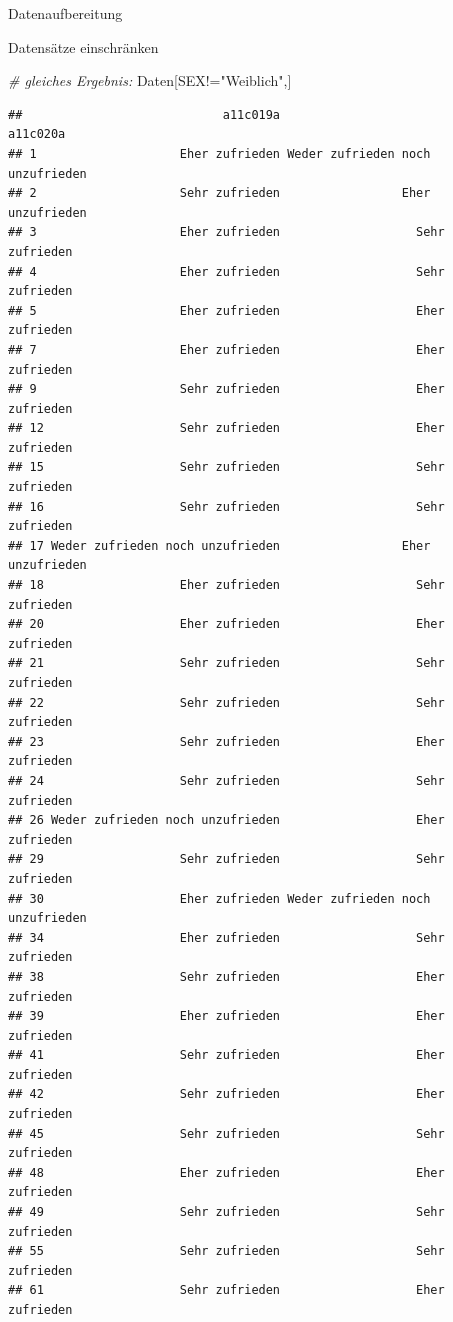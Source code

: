 \documentclass[ignorenonframetext,]{beamer}
\newenvironment{Shaded}{}{}
\newcommand{\StringTok}[1]{\textcolor[rgb]{0.25,0.44,0.63}{{#1}}}
\newcommand{\CommentTok}[1]{\textcolor[rgb]{0.38,0.63,0.69}{\textit{{#1}}}}
\newcommand{\NormalTok}[1]{{#1}}
\begin{document}
\begin{frame}[fragile]{Datenaufbereitung}
\begin{block}{Datensätze einschränken}
\begin{Shaded}
\begin{Highlighting}[]
\CommentTok{# gleiches Ergebnis:}
\NormalTok{Daten[SEX!=}\StringTok{"Weiblich"}\NormalTok{,]}
\end{Highlighting}
\end{Shaded}

\begin{verbatim}
##                            a11c019a                         a11c020a
## 1                    Eher zufrieden Weder zufrieden noch unzufrieden
## 2                    Sehr zufrieden                 Eher unzufrieden
## 3                    Eher zufrieden                   Sehr zufrieden
## 4                    Eher zufrieden                   Sehr zufrieden
## 5                    Eher zufrieden                   Eher zufrieden
## 7                    Eher zufrieden                   Eher zufrieden
## 9                    Sehr zufrieden                   Eher zufrieden
## 12                   Sehr zufrieden                   Eher zufrieden
## 15                   Sehr zufrieden                   Sehr zufrieden
## 16                   Sehr zufrieden                   Sehr zufrieden
## 17 Weder zufrieden noch unzufrieden                 Eher unzufrieden
## 18                   Eher zufrieden                   Sehr zufrieden
## 20                   Eher zufrieden                   Eher zufrieden
## 21                   Sehr zufrieden                   Sehr zufrieden
## 22                   Sehr zufrieden                   Sehr zufrieden
## 23                   Sehr zufrieden                   Eher zufrieden
## 24                   Sehr zufrieden                   Sehr zufrieden
## 26 Weder zufrieden noch unzufrieden                   Eher zufrieden
## 29                   Sehr zufrieden                   Sehr zufrieden
## 30                   Eher zufrieden Weder zufrieden noch unzufrieden
## 34                   Eher zufrieden                   Sehr zufrieden
## 38                   Sehr zufrieden                   Eher zufrieden
## 39                   Eher zufrieden                   Eher zufrieden
## 41                   Sehr zufrieden                   Eher zufrieden
## 42                   Sehr zufrieden                   Eher zufrieden
## 45                   Sehr zufrieden                   Sehr zufrieden
## 48                   Eher zufrieden                   Eher zufrieden
## 49                   Sehr zufrieden                   Sehr zufrieden
## 55                   Sehr zufrieden                   Sehr zufrieden
## 61                   Sehr zufrieden                   Eher zufrieden

\end{verbatim}
\end{block}
\end{frame}
\end{document}
